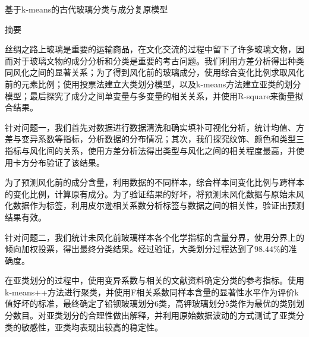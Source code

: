 \documentclass{my_paper}
\newcommand{\lunwenbiaoti}{\fontsize{15.75pt}{0}\heiti 基于k-means的古代玻璃分类与成分复原模型}
\newcommand{\zhaiyao}{\fontsize{14pt}{0}\heiti 摘要}
\begin{document}
\newpage
\begin{center}
\lunwenbiaoti

\vspace{2ex}
\zhaiyao
\end{center}

丝绸之路上玻璃是重要的运输商品，在文化交流的过程中留下了许多玻璃文物，因而对于玻璃文物的成分分析和分类是重要的考古问题。我们利用方差分析得出种类同风化之间的显著关系；为了得到风化前的玻璃成分，使用综合变化比例求取风化前的元素比例；使用投票法建立大类划分模型，以及k-means方法建立亚类的划分模型；最后探究了成分之间单变量与多变量的相关关系，并使用R-square来衡量拟合结果。

针对问题一，我们首先对数据进行数据清洗和确实填补可视化分析，统计均值、方差与变异系数等指标，分析数据的分布情况；其次，我们探究纹饰、颜色和类型三指标与风化间的关系，使用方差分析法得出类型与风化之间的相关程度最高，并使用卡方分布验证了该结果。

为了预测风化前的成分含量，利用数据的不同样本，综合样本间变化比例与跨样本的变化比例，计算原有成分。为了验证结果的好坏，将预测未风化数据与原始未风化数据作为标签，利用皮尔逊相关系数分析标签与数据之间的相关性，验证出预测结果有效。

针对问题二，我们统计未风化前玻璃样本各个化学指标的含量分界，使用分界上的倾向加权投票，得出最终分类结果。经过验证，大类划分过程达到了$98.44\%$的准确度。

在亚类划分的过程中，使用变异系数与相关的文献资料确定分类的参考指标。使用k-means++方法进行聚类，并使用F相关系数同样本含量的显著性水平作为评价k值好坏的标准，最终确定了铅钡玻璃划分6类，高钾玻璃划分5类作为最优的类别划分数目。对亚类划分的合理性做出解释，并利用原始数据波动的方式测试了亚类分类的敏感性，亚类均表现出较高的稳定性。
\end{document}
